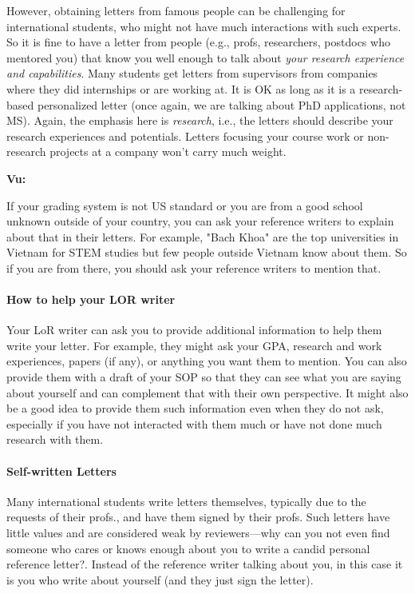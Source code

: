 \documentclass[oneside,11pt,dvipsnames]{book}
\newenvironment{commentbox}[1][]{
  \small
  \begin{mybox}
    {\small \textbf{#1}}
  }{
  \end{mybox}
}
\begin{document}
However, obtaining letters from famous people
can be challenging for international students, who might not have much interactions with such experts. So it is fine to have a letter from people (e.g., profs, researchers, postdocs who mentored you) that know you well enough to talk about \emph{your research experience and capabilities}. Many students get letters from supervisors from companies where they did internships or are working at. It is OK as long as it is a research-based personalized letter (once again, we are talking about PhD applications, not MS). Again, the emphasis here is \emph{research}, i.e., the letters should describe your research experiences and potentials. Letters focusing your course work or non-research projects at a company won't carry much weight.

\begin{commentbox}[Vu:]
  If your grading system is not US standard or you are from a good school unknown outside of your country, you can ask your reference writers to explain about that in their letters.  For example, "Bach Khoa" are the top universities in Vietnam for STEM studies but few people outside Vietnam know about them.  So if you are from there, you should ask your reference writers to mention that.
\end{commentbox}

\paragraph{How to help your LOR writer} Your LoR writer can ask you to provide additional information to help them write your letter.  For example, they might ask your GPA, research and work experiences, papers (if any), or anything you want them to mention. You can also provide them with a draft of your SOP so that they can see what you are saying about yourself and can complement that with their own perspective.  It might also be a good idea to provide them such information even when they do not ask, especially if you have not interacted with them much or have not done much research with them.


\paragraph{Self-written Letters} Many international students write letters themselves, typically due to the requests of their profs., and have them signed by their profs. Such letters have little values and are considered weak by reviewers---why can you not even find someone who cares or knows enough about you to write a candid personal reference letter?.  Instead of the reference writer talking about you, in this case it is you who write about yourself (and they just sign the letter).
\end{document}
